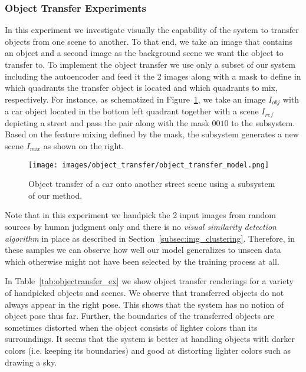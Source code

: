 \documentclass[12pt,a4paper]{article}
\begin{document}
\subsubsection{Object Transfer Experiments}\label{subsubsec:objTransfExp}
In this experiment we investigate visually the capability of the system to transfer objects from one scene to another. To that end, we take an image that contains an object and a second image as the background scene we want the object to transfer to. To implement the object transfer we use only a subset of our system including the autoencoder and feed it the 2 images along with a mask to define in which quadrants the transfer object is located and which quadrants to mix, respectively. For instance, as schematized in Figure~\ref{fig:objectransfer_arch}, we take an image $I_{obj}$ with a car object located in the bottom left quadrant together with a scene $I_{ref}$ depicting a street and pass the pair along with the mask $0010$ to the subsystem. Based on the feature mixing defined by the mask, the subsystem generates a new scene $I_{mix}$ as shown on the right.
\begin{figure}[ht]
\centering
\texttt{[image: images/object\_transfer/object\_transfer\_model.png]}
\caption{Object transfer of a car onto another street scene using a subsystem of our method.}
\label{fig:objectransfer_arch}
\end{figure}
Note that in this experiment we handpick the 2 input images from random sources by human judgment only and there is no \textit{visual similarity detection algorithm} in place as described in Section~\ref{subsec:img_clustering}. Therefore, in these samples we can observe how well our model generalizes to unseen data which otherwise might not have been selected by the training process at all.

In Table~\ref{tab:objectransfer_ex} we show object transfer renderings for a variety of handpicked objects and scenes. We observe that transferred objects do not always appear in the right pose. This shows that the system has no notion of object pose thus far. Further, the boundaries of the transferred objects are sometimes distorted when the object consists of lighter colors than its surroundings. It seems that the system is better at handling objects with darker colors (i.e. keeping its boundaries) and good at distorting lighter colors such as drawing a sky.

\end{document}
